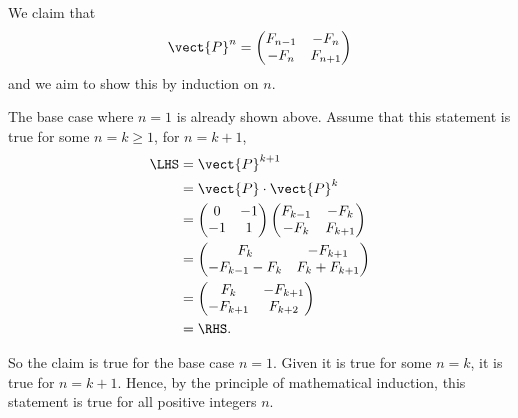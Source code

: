 \begin{enumerate}
\begin{enumerate}
                    We claim that
                    \[
                        \vect{P}^n = \begin{pmatrix}
                            F_{n - 1} & - F_n \\ - F_n & F_{n + 1}
                        \end{pmatrix}
                    \]
                    and we aim to show this by induction on \(n\).

                    The base case where \(n = 1\) is already shown above. Assume that this statement is true for some \(n = k \geq 1\), for \(n = k + 1\),
                    \begin{align*}
                        \LHS & = \vect{P}^{k + 1}                                        \\
                             & = \vect{P} \cdot \vect{P}^k                               \\
                             & = \begin{pmatrix}
                                     0 & -1 \\ -1 & 1
                                 \end{pmatrix} \begin{pmatrix}
                                                   F_{k - 1} & -F_k \\ -F_k & F_{k + 1}
                                               \end{pmatrix}       \\
                             & = \begin{pmatrix}
                                     F_k & - F_{k + 1} \\ - F_{k - 1} - F_k & F_k + F_{k + 1}
                                 \end{pmatrix} \\
                             & = \begin{pmatrix}
                                     F_k & - F_{k + 1} \\ - F_{k + 1} & F_{k + 2}
                                 \end{pmatrix}             \\
                             & = \RHS.
                    \end{align*}

                    So the claim is true for the base case \(n = 1\). Given it is true for some \(n = k\), it is true for \(n = k + 1\). Hence, by the principle of mathematical induction, this statement is true for all positive integers \(n\).


\end{enumerate}
\end{enumerate}
